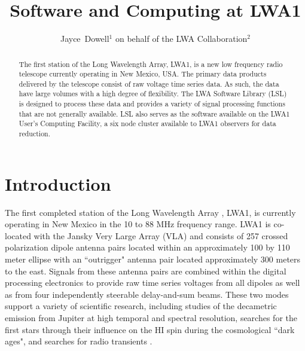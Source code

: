 
\resetcounters




\title{Software and Computing at LWA1}
\author{
Jayce~Dowell$^1$ on behalf of the LWA Collaboration$^2$
}


\begin{abstract}
The first station of the Long Wavelength Array, LWA1, is a new low frequency radio telescope currently operating in New Mexico, USA.  The primary data products delivered by the telescope consist of raw voltage time series data.  As such, the data have large volumes with a high degree of flexibility.  The LWA Software Library (LSL) is designed to process these data and provides a variety of signal processing functions that are not generally available.  LSL also serves as the software available on the LWA1 User's Computing Facility, a six node cluster available to LWA1 observers for data reduction.
\end{abstract}

\section{Introduction}
The first completed station of the Long Wavelength Array \citep[LWA;][]{LWA}, LWA1, is currently operating in New Mexico in the 10 to 88 MHz frequency range.  LWA1 is co-located with the Jansky Very Large Array (VLA) and consists of 257 crossed polarization dipole antenna pairs located within an approximately 100 by 110 meter ellipse with an ``outrigger" antenna pair located approximately 300 meters to the east.  Signals from these antenna pairs are combined within the digital processing electronics to provide raw time series voltages from all dipoles as well as from four independently steerable delay-and-sum beams.  These two modes support a variety of scientific research, including studies of the decametric emission from Jupiter at high temporal and spectral resolution, searches for the first stars through their influence on the HI spin during the cosmological ``dark ages", and searches for radio transients \citep[see][and references therein]{FL}.

